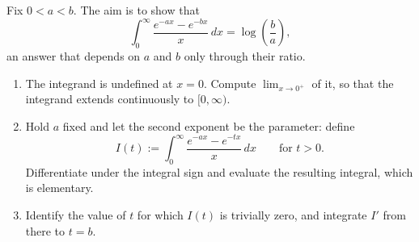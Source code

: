 \begin{aiexercise}
\label{ex:ai_frullani}
Fix $0 < a < b$. The aim is to show that
\[\int_0^\infty \frac{e^{-ax} - e^{-bx}}{x}\,dx = \log\!\left(\frac{b}{a}\right),\]
an answer that depends on $a$ and $b$ only through their ratio.
\begin{enumerate}[label=\textbf{(\alph*)}]
  \item The integrand is undefined at $x = 0$. Compute $\lim_{x\to0^+}$ of it, so that the
    integrand extends continuously to $[0,\infty)$.
  \item Hold $a$ fixed and let the second exponent be the parameter: define
    \[I(t) := \int_0^\infty \frac{e^{-ax} - e^{-tx}}{x}\,dx \qquad \text{for } t > 0.\]
    Differentiate under the integral sign and evaluate the resulting integral, which is
    elementary.
  \item Identify the value of $t$ for which $I(t)$ is trivially zero, and integrate $I'$ from
    there to $t = b$.
\end{enumerate}
\end{aiexercise}

